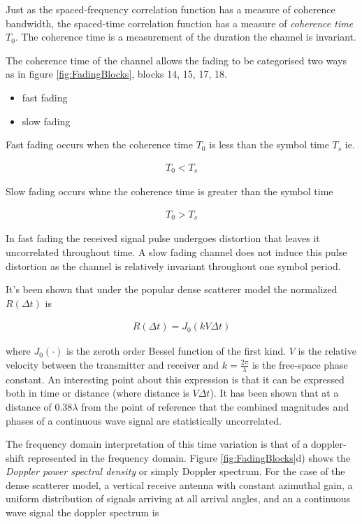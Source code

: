 Just as the spaced-frequency correlation function has a %
measure of coherence bandwidth, the spaced-time %
correlation function has a measure of \emph{coherence %
time} $T_{0}$. The coherence time is a measurement of %
the duration the channel is invariant. 

The coherence time of the channel allows the fading %
to be categorised two ways as in figure \ref{fig:FadingBlocks}, %
blocks 14, 15, 17, 18.

\begin{itemize}
	\item{fast fading}
	\item{slow fading}
\end{itemize}

Fast fading occurs when the coherence time $T_{0}$ %
is less than the symbol time $T_{s}$ ie.

\begin{align}
	T_{0} < T_{s}
\end{align}

Slow fading occurs whne the coherence time is %
greater than the symbol time

\begin{align}
	T_{0} > T_{s}
\end{align}

In fast fading the received signal pulse undergoes %
distortion that leaves it uncorrelated throughout time. %
A slow fading channel does not induce this pulse distortion %
as the channel is relatively invariant throughout one symbol %
period.

It's been shown \cite{Clarke68} that under the popular %
dense scatterer model the normalized $R(\Delta t)$ is

\begin{align}
	R(\Delta t) = J_{0}(kV \Delta t)
\end{align}

where $J_{0}(\cdot)$ is the zeroth order Bessel %
function of the first kind. $V$ is the relative velocity %
between the transmitter and receiver and %
$k = \frac{2\pi}{\lambda}$ is the free-space %
phase constant. An interesting point about %
this expression is that it can be expressed both %
in time or distance (where distance is $V\Delta t$). %
It has been shown \cite{Amoroso96} that at a %
distance of $0.38\lambda$ from the point of %
reference that the combined magnitudes and %
phases of a continuous wave signal are %
statistically uncorrelated.

The frequency domain interpretation of %
this time variation is that of a doppler-shift %
represented in the frequency domain. Figure %
\ref{fig:FadingBlocks}d) shows the \emph{%
Doppler power spectral density} or simply %
Doppler spectrum. For the case of the dense %
scatterer model, a vertical receive antenna with %
constant azimuthal gain, a uniform distribution of %
signals arriving at all arrival angles, and an a %
continuous wave signal the doppler spectrum is %
\cite{Clarke68}

